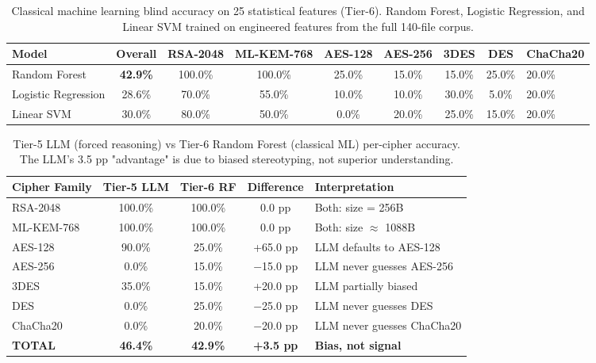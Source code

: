 \begin{table}[htbp]
\centering
\caption{Classical machine learning blind accuracy on 25 statistical features (Tier-6). Random Forest, Logistic Regression, and Linear SVM trained on engineered features from the full 140-file corpus.}
\label{tab:tier6}
\begin{tabular}{lccccccc}
\toprule
\textbf{Model} & \textbf{Overall} & \textbf{RSA-2048} & \textbf{ML-KEM-768} & \textbf{AES-128} & \textbf{AES-256} & \textbf{3DES} & \textbf{DES} & \textbf{ChaCha20} \\
\midrule
Random Forest & \textbf{42.9\%} & 100.0\% & 100.0\% & 25.0\% & 15.0\% & 15.0\% & 25.0\% & 20.0\% \\
Logistic Regression & 28.6\% & 70.0\% & 55.0\% & 10.0\% & 10.0\% & 30.0\% & 5.0\% & 20.0\% \\
Linear SVM & 30.0\% & 80.0\% & 50.0\% & 0.0\% & 20.0\% & 25.0\% & 15.0\% & 20.0\% \\
\bottomrule
\end{tabular}
\end{table}

\begin{table}[htbp]
\centering
\caption{Tier-5 LLM (forced reasoning) vs Tier-6 Random Forest (classical ML) per-cipher accuracy. The LLM's 3.5 pp "advantage" is due to biased stereotyping, not superior understanding.}
\label{tab:tier5_vs_tier6}
\begin{tabular}{lcccl}
\toprule
\textbf{Cipher Family} & \textbf{Tier-5 LLM} & \textbf{Tier-6 RF} & \textbf{Difference} & \textbf{Interpretation} \\
\midrule
RSA-2048 & 100.0\% & 100.0\% & 0.0 pp & Both: size = 256B \\
ML-KEM-768 & 100.0\% & 100.0\% & 0.0 pp & Both: size $\approx$ 1088B \\
AES-128 & 90.0\% & 25.0\% & +65.0 pp & LLM defaults to AES-128 \\
AES-256 & 0.0\% & 15.0\% & $-$15.0 pp & LLM never guesses AES-256 \\
3DES & 35.0\% & 15.0\% & +20.0 pp & LLM partially biased \\
DES & 0.0\% & 25.0\% & $-$25.0 pp & LLM never guesses DES \\
ChaCha20 & 0.0\% & 20.0\% & $-$20.0 pp & LLM never guesses ChaCha20 \\
\midrule
\textbf{TOTAL} & \textbf{46.4\%} & \textbf{42.9\%} & \textbf{+3.5 pp} & \textbf{Bias, not signal} \\
\bottomrule
\end{tabular}
\end{table}
